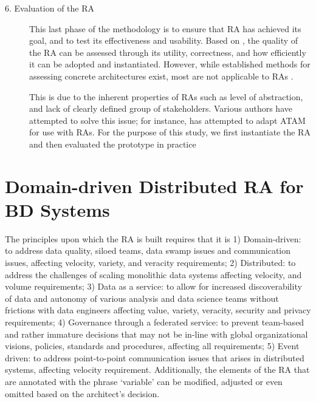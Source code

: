 \documentclass[a4paper,11pt]{article}
\let\cite\citep
\begin{document}
\begin{description}
\item[6. Evaluation of the RA] This last phase of the methodology is to ensure that RA has achieved its goal, and to test its effectiveness and usability. Based on \citet{galster2011empirically}, the quality of the RA can be assessed through its utility, correctness, and how efficiently it can be adopted and instantiated. However, while established methods for assessing concrete architectures exist, most are not applicable to RAs \cite{Avgeriou}. 

This is due to the inherent properties of RAs such as level of abstraction, and lack of clearly defined group of stakeholders. Various authors have attempted to solve this issue; for instance, \citet{angelov2008towards} has attempted to adapt ATAM for use with RAs. For the purpose of this study, we first instantiate the RA and then evaluated the prototype in practice

\end{description}


\section{Domain-driven Distributed RA for BD Systems}
\nobreak{}
The principles upon which the RA is built requires that it is 1) Domain-driven: to address data quality, siloed teams, data swamp issues and communication issues, affecting velocity, variety, and veracity requirements; 2) Distributed: to address the challenges of scaling monolithic data systems affecting velocity, and volume requirements; 3) Data as a service: to allow for increased discoverability of data and autonomy of various analysis and data science teams without frictions with data engineers affecting value, variety, veracity, security and privacy requirements; 4) Governance through a federated service: to prevent team-based and rather immature decisions that may not be in-line with global organizational visions, policies, standards and procedures, affecting all requirements; 5) Event driven: to address point-to-point communication issues that arises in distributed systems, affecting velocity requirement. Additionally, the elements of the RA that are annotated with the phrase `variable' can be modified, adjusted or even omitted based on the architect's decision. 
\end{document}
